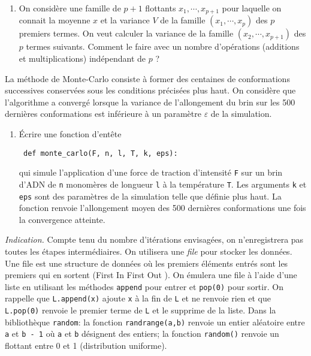 \begin{enumerate}[resume]
 \item  On considère une famille de $p+1$ flottants $x_1, \cdots, x_{p+1}$ pour laquelle on connait la moyenne $x$ et la variance $V$ de la famille  $(x_1, \cdots, x_p)$ des $p$ premiers termes. On veut calculer la variance de la famille $(x_2,\cdots, x_{p+1})$ des $p$ termes suivants.
Comment le faire avec un nombre d'opérations (additions et multiplications) indépendant de $p$ ?
\end{enumerate}
La méthode de Monte-Carlo consiste à former des centaines de conformations successives conservées sous les conditions précisées plus haut. On considère que l'algorithme a convergé lorsque la variance de l'allongement du brin sur les 500 dernières conformations est inférieure à un paramètre $\varepsilon$ de la simulation.
\begin{enumerate}[resume]
 \item \'Ecrire une fonction d'entête
\begin{verbatim}
 def monte_carlo(F, n, l, T, k, eps):
\end{verbatim}
qui simule l'application d'une force de traction d'intensité \texttt{F} sur un brin d'ADN de \texttt{n} monomères de longueur \texttt{l} à la température \texttt{T}. Les arguments \texttt{k} et \texttt{eps} sont des paramètres de la simulation telle que définie plus haut.\newline
La fonction renvoie l'allongement moyen des 500 dernières conformations une fois la convergence atteinte.
\end{enumerate}
\emph{Indication.} Compte tenu du nombre d'itérations envisagées, on n'enregistrera pas toutes les étapes intermédiaires. On utilisera une \emph{file} pour stocker les données. Une file est une structure de données où les premiers éléments entrés sont les premiers qui en sortent (\og First In First Out \fg).\newline
On émulera une file à l'aide d'une liste en utilisant les méthodes \texttt{append} pour entrer et \texttt{pop(0)} pour sortir.\newline
On rappelle que \texttt{L.append(x)} ajoute \texttt{x} à la fin de \texttt{L} et ne renvoie rien et que \texttt{L.pop(0)} renvoie le premier terme de \texttt{L} et le supprime de la liste.\newline
Dans la bibliothèque \texttt{random}: la fonction \texttt{randrange(a,b)} renvoie un entier aléatoire entre \texttt{a} et \texttt{b - 1} où \texttt{a} et \texttt{b} désignent des entiers; la fonction \texttt{random()} renvoie un flottant entre 0 et 1 (distribution uniforme).

